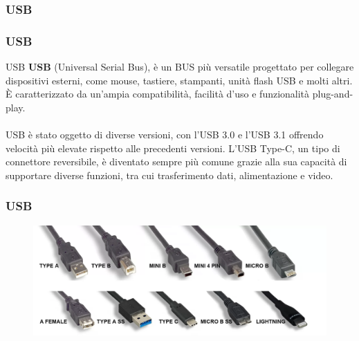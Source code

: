\subsubsection[USB]{USB}
\begin{frame}
	\frametitle{USB}
	  
	\begin{block}{USB}
		\textbf{USB} (Universal Serial Bus), è un BUS più versatile progettato per collegare dispositivi esterni, come mouse, tastiere, stampanti, unità flash USB e molti altri. È caratterizzato da un'ampia compatibilità, facilità d'uso e funzionalità plug-and-play.\\~\\
		
		USB è stato oggetto di diverse versioni, con l'USB 3.0 e l'USB 3.1 offrendo velocità più elevate rispetto alle precedenti versioni. L'USB Type-C, un tipo di connettore reversibile, è diventato sempre più comune grazie alla sua capacità di supportare diverse funzioni, tra cui trasferimento dati, alimentazione e video.
	\end{block}
\end{frame}


\begin{frame}
	\frametitle{USB}
	
	\begin{figure}[!htbp]
		\centering
		\includegraphics[width=1.0\linewidth]{images/6_bus/USBs.png}
	\end{figure}
\end{frame}








